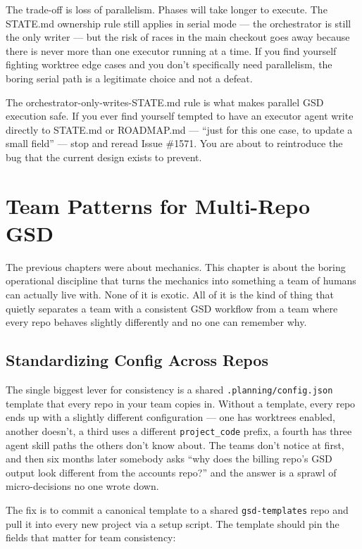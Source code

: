 \documentclass[11pt,letterpaper,openany]{book}
\begin{document}
The trade-off is loss of parallelism. Phases will take longer to
execute. The STATE.md ownership rule still applies in serial mode
--- the orchestrator is still the only writer --- but the risk of
races in the main checkout goes away because there is never more
than one executor running at a time. If you find yourself fighting
worktree edge cases and you don't specifically need parallelism,
the boring serial path is a legitimate choice and not a defeat.

\begin{gsdtip}
The orchestrator-only-writes-STATE.md rule is what makes parallel
GSD execution safe. If you ever find yourself tempted to have an
executor agent write directly to STATE.md or ROADMAP.md ---
``just for this one case, to update a small field'' --- stop and
reread Issue \#1571. You are about to reintroduce the bug that
the current design exists to prevent.
\end{gsdtip}

\chapter{Team Patterns for Multi-Repo GSD}

The previous chapters were about mechanics. This chapter is about
the boring operational discipline that turns the mechanics into
something a team of humans can actually live with. None of it is
exotic. All of it is the kind of thing that quietly separates a
team with a consistent GSD workflow from a team where every repo
behaves slightly differently and no one can remember why.

\section{Standardizing Config Across Repos}

The single biggest lever for consistency is a shared
\texttt{.planning/config.json} template that every repo in your team
copies in. Without a template, every repo ends up with a slightly
different configuration --- one has worktrees enabled, another
doesn't, a third uses a different \texttt{project\_code} prefix,
a fourth has three agent skill paths the others don't know about.
The teams don't notice at first, and then six months later somebody
asks ``why does the billing repo's GSD output look different from
the accounts repo?'' and the answer is a sprawl of micro-decisions
no one wrote down.

The fix is to commit a canonical template to a shared
\texttt{gsd-templates} repo and pull it into every new project
via a setup script. The template should pin the fields that matter
for team consistency:
\end{document}
